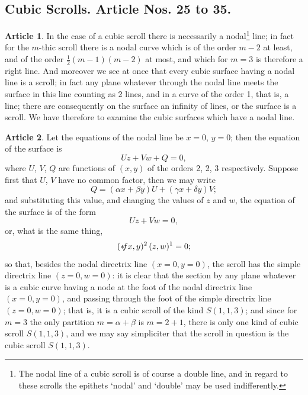 \documentclass[12pt,a4paper]{article}
\theoremstyle{definition}
\newtheorem{art}{Article}[section]
\begin{document}
\subsection*{Cubic Scrolls. Article Nos. 25 to 35.}

\begin{art}
In the case of a cubic scroll there is necessarily a nodal\footnote{The nodal line of a cubic scroll is of course a double line, and in regard to these scrolls the epithets `nodal' and `double' may be used indifferently.} line; in fact for the $m$-thic scroll there is a nodal curve which is of the order $m - 2$ at least, and of the order $\tfrac{1}{2}(m - 1)(m - 2)$ at most, and which for $m = 3$ is therefore a right line. And moreover we see at once that every cubic surface having a nodal line is a scroll; in fact any plane whatever through the nodal line meets the surface in this line counting as 2 lines, and in a curve of the order 1, that is, a line; there are consequently on the surface an infinity of lines, or the surface is a scroll. We have therefore to examine the cubic surfaces which have a nodal line.
\end{art}

\begin{art}
Let the equations of the nodal line be $x = 0$, $y = 0$; then the equation of the surface is
\[
Uz + Vw + Q = 0,
\]
where $U$, $V$, $Q$ are functions of $(x, y)$ of the orders 2, 2, 3 respectively. Suppose first that $U$, $V$ have no common factor, then we may write
\[
Q = (\alpha x + \beta y)U + (\gamma x + \delta y)V;
\]
and substituting this value, and changing the values of $z$ and $w$, the equation of the surface is of the form
\[
Uz + Vw = 0,
\]
or, what is the same thing,
\[
(* \hspace{-2pt} fx, y)^2 \, (z, w)^1 = 0;
\]
so that, besides the nodal directrix line $(x = 0, y = 0)$, the scroll has the simple directrix line $(z = 0, w = 0)$: it is clear that the section by any plane whatever is a cubic curve having a node at the foot of the nodal directrix line $(x = 0, y = 0)$, and passing through the foot of the simple directrix line $(z = 0, w = 0)$; that is, it is a cubic scroll of the kind $S(1, 1, 3)$; and since for $m = 3$ the only partition $m = \alpha + \beta$ is $m = 2 + 1$, there is only one kind of cubic scroll $S(1, 1, 3)$, and we may say simpliciter that the scroll in question is the cubic scroll $S(1, 1, 3)$.
\end{art}
\end{document}

